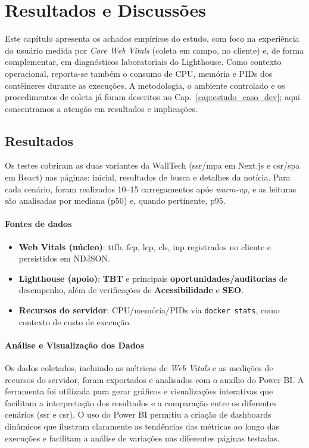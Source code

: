 \chapter{Resultados e Discussões}
\label{cap:resultados}

Este capítulo apresenta os achados empíricos do estudo, com foco na experiência do usuário medida por \textit{Core Web Vitals} (coleta em campo, no cliente) e, de forma complementar, em diagnósticos laboratoriais do Lighthouse. Como contexto operacional, reporta-se também o consumo de CPU, memória e PIDs dos contêineres durante as execuções. A metodologia, o ambiente controlado e os procedimentos de coleta já foram descritos no Cap.~\ref{cap:estudo_caso_dev}; aqui concentramos a atenção em resultados e implicações.

\section{Resultados}
Os testes cobriram as duas variantes da WallTech (\acrshort{ssr}/\acrshort{mpa} em Next.js e \acrshort{csr}/\acrshort{spa} em React) nas páginas: inicial, resultados de busca e detalhes da notícia. Para cada cenário, foram realizados 10--15 carregamentos após \textit{warm-up}, e as leituras são analisadas por mediana (p50) e, quando pertinente, p95.

\subsubsection*{Fontes de dados}
\begin{itemize}
    \item \textbf{Web Vitals (núcleo)}: \acrshort{ttfb}, \acrshort{fcp}, \acrshort{lcp}, \acrshort{cls}, \acrshort{inp} registrados no cliente e persistidos em NDJSON.
    \item \textbf{Lighthouse (apoio)}: \textbf{TBT} e principais \textbf{oportunidades/auditorias} de desempenho, além de verificações de \textbf{Acessibilidade} e \textbf{SEO}.
    \item \textbf{Recursos do servidor}: CPU/memória/PIDs via \texttt{docker stats}, como contexto de custo de execução.
\end{itemize}

\subsubsection*{Análise e Visualização dos Dados}
Os dados coletados, incluindo as métricas de \textit{Web Vitals} e as medições de recursos do servidor, foram exportados e analisados com o auxílio do Power BI. A ferramenta foi utilizada para gerar gráficos e visualizações interativas que facilitam a interpretação dos resultados e a comparação entre os diferentes cenários (\acrshort{ssr} e \acrshort{csr}). O uso do Power BI permitiu a criação de dashboards dinâmicos que ilustram claramente as tendências das métricas ao longo das execuções e facilitam a análise de variações nas diferentes páginas testadas.

